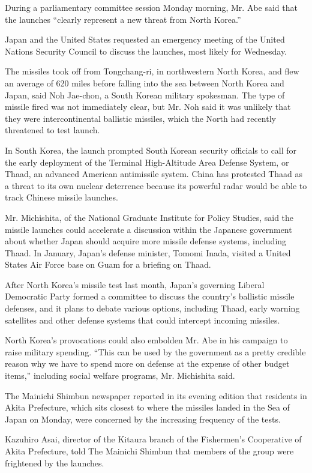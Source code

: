 During a parliamentary committee session Monday morning, Mr. Abe said
that the launches ``clearly represent a new threat from North Korea.''

Japan and the United States requested an emergency meeting of the United
Nations Security Council to discuss the launches, most likely for
Wednesday.

The missiles took off from Tongchang-ri, in northwestern North Korea,
and flew an average of 620 miles before falling into the sea between
North Korea and Japan, said Noh Jae-chon, a South Korean military
spokesman. The type of missile fired was not immediately clear, but Mr.
Noh said it was unlikely that they were intercontinental ballistic
missiles, which the North had recently threatened to test launch.

In South Korea, the launch prompted South Korean security officials to
call for the early deployment of the Terminal High-Altitude Area Defense
System, or Thaad, an advanced American antimissile system. China has
protested Thaad as a threat to its own nuclear deterrence because its
powerful radar would be able to track Chinese missile launches.

Mr. Michishita, of the National Graduate Institute for Policy Studies,
said the missile launches could accelerate a discussion within the
Japanese government about whether Japan should acquire more missile
defense systems, including Thaad. In January, Japan's defense minister,
Tomomi Inada, visited a United States Air Force base on Guam for a
briefing on Thaad.

After North Korea's missile test last month, Japan's governing Liberal
Democratic Party formed a committee to discuss the country's ballistic
missile defenses, and it plans to debate various options, including
Thaad, early warning satellites and other defense systems that could
intercept incoming missiles.

North Korea's provocations could also embolden Mr. Abe in his campaign
to raise military spending. ``This can be used by the government as a
pretty credible reason why we have to spend more on defense at the
expense of other budget items,'' including social welfare programs, Mr.
Michishita said.

The Mainichi Shimbun newspaper reported in its evening edition that
residents in Akita Prefecture, which sits closest to where the missiles
landed in the Sea of Japan on Monday, were concerned by the increasing
frequency of the tests.

Kazuhiro Asai, director of the Kitaura branch of the Fishermen's
Cooperative of Akita Prefecture, told The Mainichi Shimbun that members
of the group were frightened by the launches.


